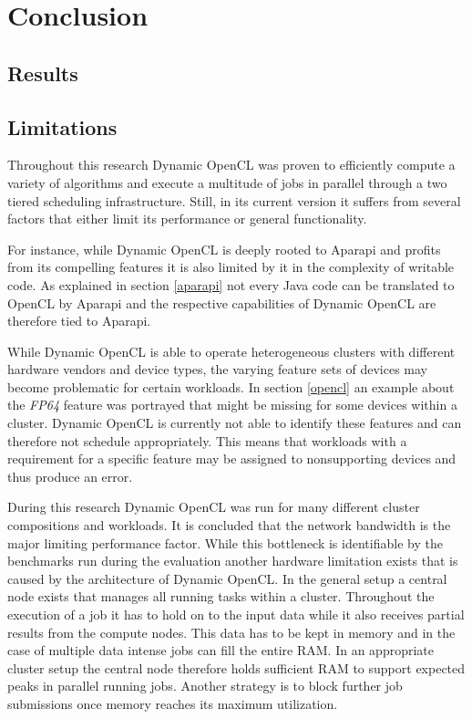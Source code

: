 \chapter{Conclusion}

\section{Results}

\section{Limitations}

Throughout this research Dynamic OpenCL was proven to efficiently compute a variety of algorithms and  execute a multitude of jobs in parallel through a two tiered scheduling infrastructure. Still, in its current version it suffers from several factors that either limit its performance or general functionality.

For instance, while Dynamic OpenCL is deeply rooted to Aparapi and profits from its compelling features it is also limited by it in the complexity of writable code. As explained in section \ref{aparapi} not every Java code can be translated to OpenCL by Aparapi and the respective capabilities of Dynamic OpenCL are therefore tied to Aparapi.

While Dynamic OpenCL is able to operate heterogeneous clusters with different hardware vendors and device types, the varying feature sets of devices may become problematic for certain workloads. In section \ref{opencl} an example about the \textit{FP64} feature was portrayed that might be missing for some devices within a cluster. Dynamic OpenCL is currently not able to identify these features and can therefore not schedule appropriately. This means that workloads with a requirement for a specific feature may be assigned to nonsupporting devices and thus produce an error.

During this research Dynamic OpenCL was run for many different cluster compositions and workloads. It is concluded that the network bandwidth is the major limiting performance factor. While this bottleneck is identifiable by the benchmarks run during the evaluation another hardware limitation exists that is caused by the architecture of Dynamic OpenCL. In the general setup a central node exists that manages all running tasks within a cluster. Throughout the execution of a job it has to hold on to the input data while it also receives partial results from the compute nodes. This data has to be kept in memory and in the case of multiple data intense jobs can fill the entire RAM. In an appropriate cluster setup the central node therefore holds sufficient RAM to support expected peaks in parallel running jobs. Another strategy is to block further job submissions once memory reaches its maximum utilization.

